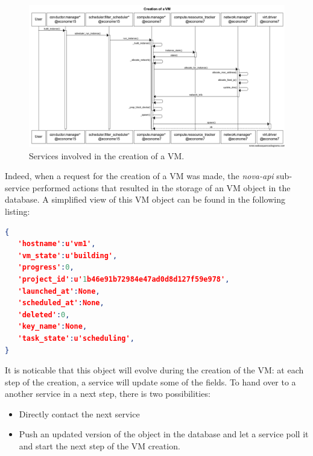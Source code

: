 \begin{figure}
        \centering
        \includegraphics[width=23cm]{figures/sequence.png}        
        \caption{Services involved in the creation of a VM.}
        \label{fig:sequence_vm_creation}
\vspace*{-.3cm}
\end{figure}

Indeed, when a request for the creation of a VM was made, the \emph{nova-api}
sub-service performed actions that resulted in the storage of an VM object in
the database. A simplified view of this VM object can be found in the following
listing:

\begin{lstlisting}[language=json,firstnumber=1]
{
   'hostname':u'vm1',
   'vm_state':u'building',
   'progress':0,
   'project_id':u'1b46e91b72984e47ad0d8d127f59e978',
   'launched_at':None,
   'scheduled_at':None,
   'deleted':0,
   'key_name':None,
   'task_state':u'scheduling',
}
\end{lstlisting}

It is noticable that this object will evolve during the creation of the VM: at
each step of the creation, a service will update some of the fields. To hand
over to a another service in a next step, there is two possibilities:

\begin{itemize}
\item Directly contact the next service
\item Push an updated version of the object in the database and let a service
poll it and start the next step of the VM creation.
\end{itemize}